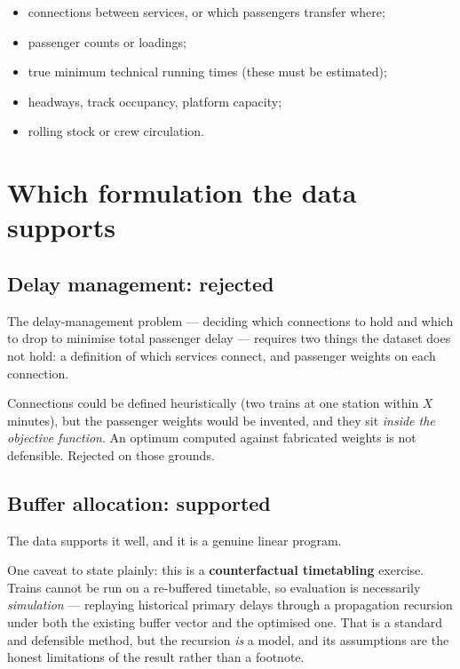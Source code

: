 \documentclass[11pt,a4paper]{article}
\begin{document}
\begin{itemize}[leftmargin=1.4em,itemsep=0.15em]
  \item connections between services, or which passengers transfer where;
  \item passenger counts or loadings;
  \item true minimum technical running times (these must be estimated);
  \item headways, track occupancy, platform capacity;
  \item rolling stock or crew circulation.
\end{itemize}

\section{Which formulation the data supports}

\subsection*{Delay management: rejected}

The delay-management problem --- deciding which connections to hold and which to drop to
minimise total passenger delay --- requires two things the dataset does not hold: a
definition of which services connect, and passenger weights on each connection.

Connections could be defined heuristically (two trains at one station within $X$ minutes),
but the passenger weights would be invented, and they sit \emph{inside the objective
function}. An optimum computed against fabricated weights is not defensible. Rejected on
those grounds.

\subsection*{Buffer allocation: supported}

The data supports it well, and it is a genuine linear program.

One caveat to state plainly: this is a \textbf{counterfactual timetabling} exercise. Trains
cannot be run on a re-buffered timetable, so evaluation is necessarily \emph{simulation} ---
replaying historical primary delays through a propagation recursion under both the existing
buffer vector and the optimised one. That is a standard and defensible method, but the
recursion \emph{is} a model, and its assumptions are the honest limitations of the result
rather than a footnote.
\end{document}
